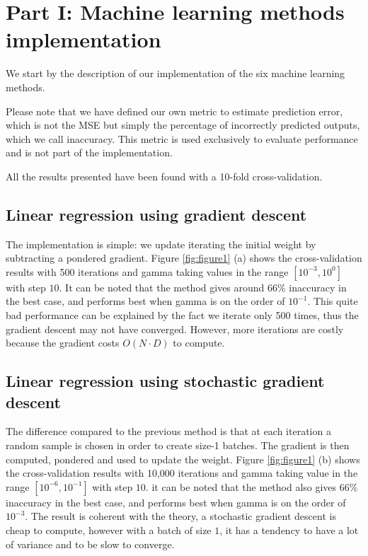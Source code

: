 \documentclass[10pt,conference,compsocconf]{IEEEtran}
\begin{document}
\section{Part I: Machine learning methods implementation}
We start by the description of our implementation of the six machine learning methods.

Please note that we have defined our own metric to estimate prediction error, which
is not the MSE but simply the percentage of incorrectly predicted outputs, which
we call inaccuracy.
This metric is used exclusively to evaluate performance and is not part of the
implementation.

All the results presented have been found with a 10-fold cross-validation.

\subsection{Linear regression using gradient descent}
The implementation is simple: we update iterating the initial weight by subtracting a pondered gradient.
Figure \ref{fig:figure1} (a) shows the cross-validation results with 500
iterations and gamma taking values in the range $[10^{-3}, 10^{0}]$ with step
$10$. It can be noted that the method gives around 66\% inaccuracy in the best
case, and performs best when gamma is on the order of $10^{-1}$. This quite bad
performance can be explained by the fact we iterate only 500 times, thus
the gradient descent may not have converged. However, more iterations are costly
because the gradient costs $O(N\cdot D)$ to compute.

\subsection{Linear regression using stochastic gradient descent}
The difference compared to the previous method is that at each iteration a
random sample is chosen in order to
create size-1 batches. The gradient is then computed, pondered and used to
update the weight. Figure \ref{fig:figure1} (b) shows the cross-validation
results with 10,000 iterations and gamma taking value in the range $[10^{-6},
10^{-1}]$ with step $10$. it can be noted that the method also gives $66$\%
inaccuracy in the best case, and performs best when gamma is on the order of
$10^{-3}$. The result is coherent with the theory, a stochastic gradient descent
is cheap to compute, however with a batch of size $1$, it has a tendency to have a
lot of variance and to be slow to converge.
\end{document}
